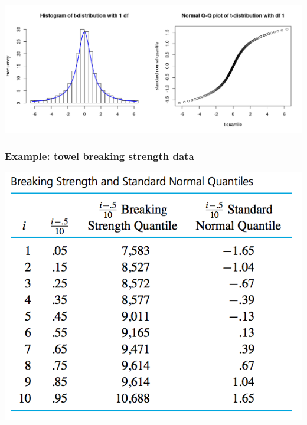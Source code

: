 \documentclass{beamer}
\numberwithin{equation}{section}
\begin{document}
\begin{frame}[plain]
\includegraphics[width = 1.2\linewidth]{./t_normal_QQ.png}
\end{frame}

\begin{frame}
\frametitle{Example: towel breaking strength data}
\begin{center}
 \includegraphics{../../fig/towelqqdata.png}
\end{center}
\end{frame}
\end{document}
